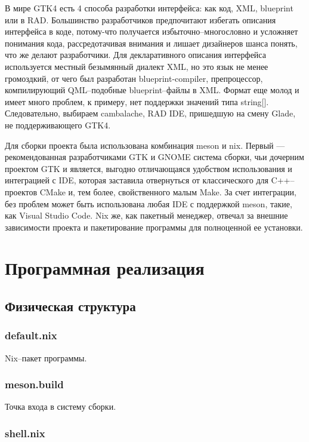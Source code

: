 \documentclass[variant=courcework]{bsuir}
\begin{document}
В мире GTK4 есть 4 способа разработки интерфейса: как код, XML, blueprint или в
RAD. Большинство разработчиков предпочитают избегать описания интерфейса в коде,
потому-что получается избыточно--многословно и усложняет понимания кода,
рассредотачивая внимания и лишает дизайнеров шанса понять, что же делают
разработчики. Для декларативного описания интерфейса используется местный
безымянный диалект XML, но это язык не менее громоздкий, от чего был разработан
blueprint-compiler, препроцессор, компилирующий QML--подобные blueprint--файлы в
XML. Формат еще молод и имеет много проблем, к примеру, нет поддержки значений
типа string[]. Следовательно, выбираем cambalache, RAD IDE, пришедшую на смену
Glade, не поддерживающего GTK4.

Для сборки проекта была использована комбинация meson и nix. Первый ---
рекомендованная разработчиками GTK и GNOME система сборки, чьи дочерним проектом
GTK и является, выгодно отличающаяся удобством использования и интеграцией с
IDE, которая заставила отвернуться от классического для C++--проектов CMake и,
тем более, свойственного малым Make. За счет интеграции, без проблем может быть
использована любая IDE с поддержкой meson, такие, как Visual Studio Code. Nix
же, как пакетный менеджер, отвечал за внешние зависимости проекта и
пакетирование программы для полноценной ее установки.

\chapter{Программная реализация}

\section{Физическая структура}

\subsection*{default.nix}

Nix--пакет программы.

\subsection{meson.build}

Точка входа в систему сборки.

\subsection{shell.nix}
\end{document}
